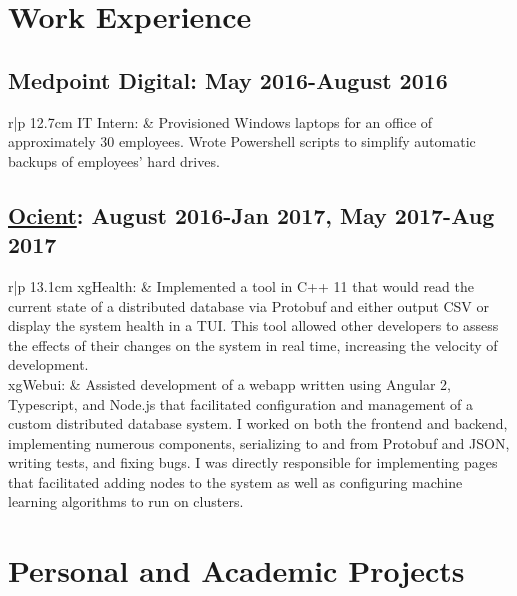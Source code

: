 \documentclass[a4paper,10pt]{article} %
\begin{document}


\section{Work Experience}
\subsection{Medpoint Digital: May 2016-August 2016}
\begin{tabular}{r|p {12.7cm}}
    IT Intern: & Provisioned Windows laptops for an office of approximately 30 employees. Wrote Powershell scripts to simplify automatic backups of employees' hard drives.
\end{tabular}
\subsection{\href{http://www.ocient.com/}{Ocient}: August 2016-Jan 2017, May 2017-Aug 2017}
\begin{tabular}{r|p {13.1cm}}
    xgHealth: & Implemented a tool in C++ 11 that would read the current state of a distributed database via Protobuf and either output CSV or display the system health in a TUI. This tool allowed other developers to assess the effects of their changes on the system in real time, increasing the velocity of development.\\ 
    xgWebui: & Assisted development of a webapp written using Angular 2, Typescript, and Node.js that facilitated configuration and management of a custom distributed database system. I worked on both the frontend and backend, implementing numerous components, serializing to and from Protobuf and JSON, writing tests, and fixing bugs.
    I was directly responsible for implementing pages that facilitated adding nodes to the system as well as configuring machine learning algorithms to run on clusters.
\end{tabular}


\section{Personal and Academic Projects}
\end{document}
